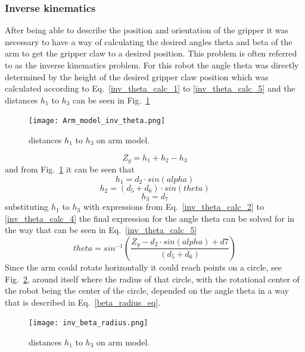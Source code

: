 \subsubsection{Inverse kinematics}
After being able to describe the position and orientation of the gripper it was necessary to have a way of calculating the desired angles theta and beta of the arm to get the gripper claw to a desired position. This problem is often referred to as the inverse kinematics problem. For this robot the angle theta was directly determined by the height of the desired gripper claw position which was calculated according to Eq.~\eq\ref{inv_theta_calc_1} to \ref{inv_theta_calc_5} and the distances \(h_1\) to \(h_3\) can be seen in Fig.~\ref{inv_theta_img}
\begin{figure}[H]
    \centering
    \texttt{[image: Arm\_model\_inv\_theta.png]}
    \caption{distances \(h_1\) to \(h_3\) on arm model.}
    \label{inv_theta_img}
\end{figure}
\begin{equation}
    Z_g = h_1+h_2 - h_3
    \label{inv_theta_calc_1}
\end{equation}
and from Fig.~\ref{inv_theta_img} it can be seen that
\begin{equation}
    h_1 = d_2 \cdot sin(alpha)
    \label{inv_theta_calc_2}
\end{equation}
\begin{equation}
    h_2 = (d_5 + d_6) \cdot sin(theta)
    \label{inv_theta_calc_3}
\end{equation}
\begin{equation}
    h_3 = d_7
    \label{inv_theta_calc_4}
\end{equation}
substituting \(h_1\) to \(h_3\) with expressions from Eq.~\eq\ref{inv_theta_calc_2} to  \eq\ref{inv_theta_calc_4} the final expression for the angle theta can be solved for in the way that can be seen in Eq.~\eq\ref{inv_theta_calc_5}
\begin{equation}
    theta = sin^{-1}(\frac{Z_g - d_2 \cdot sin(alpha) + d7}{(d_5 + d_6)})
    \label{inv_theta_calc_5}
\end{equation}
Since the arm could rotate horizontally it could reach points on a circle, see Fig.~\ref{inv_beta_radius_img}, around itself where the radius of that circle, with the rotational center of the robot being the center of the circle, depended on the angle theta in a way that is described in Eq.~\eq\ref{beta_radius_eq}.
\begin{figure}[H]
    \centering
    \texttt{[image: inv\_beta\_radius.png]}
    \caption{distances \(h_1\) to \(h_3\) on arm model.}
    \label{inv_beta_radius_img}
\end{figure}
